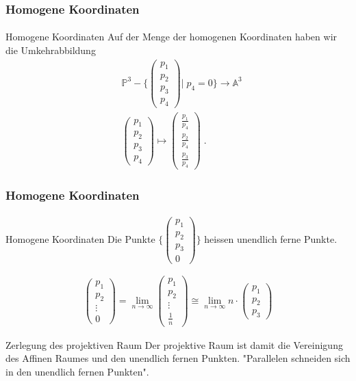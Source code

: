 \documentclass{beamer}
\begin{document}
\begin{frame}
    \frametitle{Homogene Koordinaten}
\framesubtitle{}
\begin{block}{Homogene Koordinaten}
Auf der Menge der homogenen Koordinaten haben wir die Umkehrabbildung
\begin{align*}
& \mathbb{P}^3 - \Biggl \{\begin{pmatrix} p_1 \\ p_2 \\ p_3  \\ p_4 \end{pmatrix}\Bigg | \; p_{4} = 0 \Biggr \}   \to \mathbb{A}^3 \\
& \begin{pmatrix} p_1 \\ p_2 \\ p_3  \\  p_{4} \end{pmatrix}   \mapsto \begin{pmatrix}  \frac{p_1}{ p_{4}} \\ \frac{p_2}{ p_{4}}  \\ \frac{p_3}{ p_{4}}  \end{pmatrix}  \; .
\end{align*}
\end{block}
\end{frame}


\begin{frame}
    \frametitle{Homogene Koordinaten}
\framesubtitle{}
\begin{block}{Homogene Koordinaten}
Die Punkte $ \Biggl \{ \begin{pmatrix} p_1 \\ p_2 \\ p_3  \\ 0 \end{pmatrix} \Biggr \} $ heissen unendlich ferne Punkte.

\begin{align*}
 \begin{pmatrix} p_1 \\ p_2 \\ \vdots  \\ 0 \end{pmatrix}  =\lim_{n \to \infty} \begin{pmatrix} p_1 \\ p_2 \\ \vdots  \\ \frac{1}{n} \end{pmatrix}  \cong  \lim_{n \to \infty} n \cdot  \begin{pmatrix} p_1 \\ p_2 \\ p_3 \end{pmatrix} 
\end{align*}
\end{block}

\begin{block}{Zerlegung des projektiven Raum}
Der projektive Raum ist damit die Vereinigung des Affinen Raumes und den unendlich fernen Punkten. "Parallelen schneiden sich in den unendlich fernen Punkten".
\end{block}
\end{frame}
\end{document}

